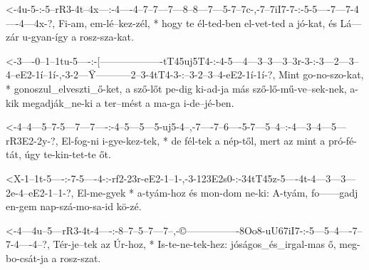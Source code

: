 


  {<-4u-5-:-5--rR3-4t--4x---:-4----4--7--7---7---8--8---7---5-7--7c-,-7--7iI7-7-:-5-5----7---7-4----4---4x-?,}
  {  Fi-am, em-lé--kez-zél, * hogy te él-ted-ben el-vet-ted a jó-kat, és Lá---zár u-gyan-így a rosz-sza-kat.}



  {<-3----0--1--1tu-5----:-[-------------------tT45uj5T4-:-4-5---4---3--3---3--3r-3-:-3---2---3--4--eE2-1í--1í-,-3-2---Ÿ-----------2--3-4tT4-3-:--3-2--3--4-eE2-1í-1í-?,}
  {  Mint go-no-szo-kat, * gonoszul_elveszti_ő-ket,        a sző-lőt pe-dig ki-ad-ja  más sző-lő-mű-ve--sek-nek, a-kik megadják_ne-ki a ter--mést a ma-ga i-de--jé-ben.}


  {<-4--4---5--7-5---7---7----:-4--5---5---5-uj5-4--,-7----7--6----5-7---5--4--:-4---3--4---5---rR3E2-2y-?,}
  {  El-fog-ni i-gye-kez-tek, * de fél-tek a nép-től, mert az mint a pró-fé-tát, úgy te-kin-tet-te    őt.}



  {<X-1--1t-5----:-7-5----4-:-rf2-23r-eE2-1--1-,-3-123E2s0-:-34tT45z-5----4t-4---3---3---2e-4--eE2-1--1-?,}
  {   El-me-gyek * a-tyám-hoz és  mon-dom ne-ki: A-tyám,     fo------gadj en-gem nap-szá-mo-sa-id  kö-zé.}




  {<-4---4u--5---rR3-4t-4----:-8--7--5--7---7--,-©----------------8Oo8-uU67iI7-:-5---5--4----7--7-4----4--?,}
  {  Tér-je--tek az  Úr-hoz, * Is-te-ne-tek-hez: jóságos_és_irgal-mas  ő,        meg-bo-csát-ja a rosz-szat.}

